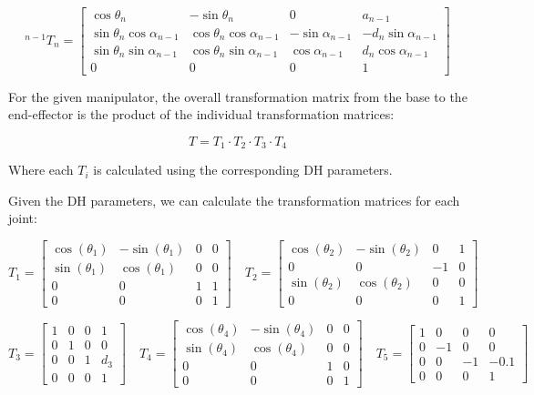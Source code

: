 \documentclass{article}
\begin{document}
\begin{equation}
  { }^{n-1} T_n=\left[\begin{array}{ccc|c}
  \cos \theta_n & -\sin \theta_n & 0 & a_{n-1} \\
  \sin \theta_n \cos \alpha_{n-1} & \cos \theta_n \cos \alpha_{n-1} & -\sin \alpha_{n-1} & -d_n \sin \alpha_{n-1} \\
  \sin \theta_n \sin \alpha_{n-1} & \cos \theta_n \sin \alpha_{n-1} & \cos \alpha_{n-1} & d_n \cos \alpha_{n-1} \\
  \hline 0 & 0 & 0 & 1
  \end{array}\right]
  \end{equation}
  
For the given manipulator, the overall transformation matrix from the base to the end-effector is the product of the individual transformation matrices:

\[
T = T_1 \cdot T_2 \cdot T_3 \cdot T_4
\]

Where each \(T_i\) is calculated using the corresponding DH parameters.

Given the DH parameters, we can calculate the transformation matrices for each joint:

\[
T_1 = 
\begin{bmatrix}
\cos(\theta_1) & -\sin(\theta_1) & 0 & 0 \\
\sin(\theta_1) & \cos(\theta_1) & 0 & 0 \\
0 & 0 & 1 & 1 \\
0 & 0 & 0 & 1
\end{bmatrix}
\quad
T_2 = 
\begin{bmatrix}
\cos(\theta_2) & -\sin(\theta_2) & 0 & 1 \\
0 & 0 & -1 & 0 \\
\sin(\theta_2) & \cos(\theta_2) & 0 & 0 \\
0 & 0 & 0 & 1
\end{bmatrix}
\]


\[
T_3 = \begin{bmatrix}
1 & 0 & 0 & 1 \\
0 & 1 & 0 & 0 \\
0 & 0 & 1 & d_3 \\
0 & 0 & 0 & 1
\end{bmatrix}
\quad
T_4 = \begin{bmatrix}
\cos(\theta_4) & -\sin(\theta_4) & 0 & 0 \\
\sin(\theta_4) & \cos(\theta_4)  & 0 & 0 \\
0 & 0 & 1 & 0 \\
0 & 0 & 0 & 1
\end{bmatrix}
\quad
T_5 = \begin{bmatrix}
1 & 0 & 0 & 0 \\
0 & -1  & 0 & 0 \\
0 & 0 & -1 & -0.1 \\
0 & 0 & 0 & 1
\end{bmatrix}
\]
\end{document}
